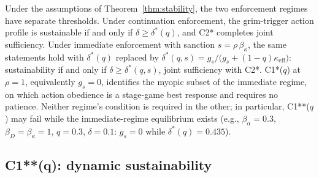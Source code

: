 \documentclass[manuscript,screen,review]{jair}
\begin{document}
\begin{corollary}
\label{cor:regimes}
Under the assumptions of Theorem~\ref{thm:stability}, the two enforcement regimes have separate thresholds. Under continuation enforcement, the grim-trigger action profile is sustainable if and only if $\delta \geq \delta^*(q)$, and C2* completes joint sufficiency. Under immediate enforcement with sanction $s = \rho\,\beta_\kappa$, the same statements hold with $\delta^*(q)$ replaced by $\delta^*(q,s) = g_s/\bigl(g_s + (1-q)\kappa_{\mathrm{eff}}\bigr)$: sustainability if and only if $\delta \geq \delta^*(q,s)$, joint sufficiency with C2*. C1*($q$) at $\rho = 1$, equivalently $g_s = 0$, identifies the myopic subset of the immediate regime, on which action obedience is a stage-game best response and requires no patience. Neither regime's condition is required in the other; in particular, C1**($q$) may fail while the immediate-regime equilibrium exists (e.g., $\beta_\alpha = 0.3$, $\beta_D = \beta_\kappa = 1$, $q = 0.3$, $\delta = 0.1$: $g_s = 0$ while $\delta^*(q) = 0.435$).
\end{corollary}

\subsection{C1**(q): dynamic sustainability}
\label{sec:c1starstar}
\end{document}
